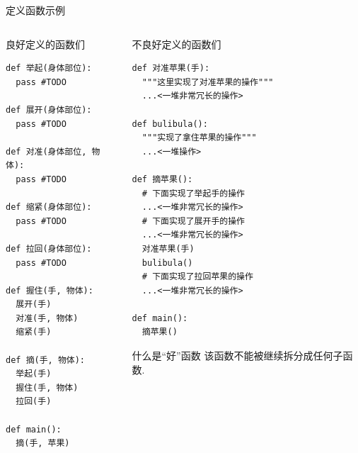 \documentclass{beamer}
\begin{document}
    \begin{frame}[fragile]{定义函数示例}
      \begin{columns}
        \begin{column}{0.4\textwidth}
          \begin{block}{\tiny 良好定义的函数们}
            \begin{lstlisting}
def 举起(身体部位):
  pass #TODO   

def 展开(身体部位):
  pass #TODO 

def 对准(身体部位, 物体):
  pass #TODO 

def 缩紧(身体部位):
  pass #TODO 

def 拉回(身体部位):
  pass #TODO 

def 握住(手, 物体):
  展开(手)
  对准(手, 物体)
  缩紧(手)

def 摘(手, 物体):
  举起(手)
  握住(手, 物体)
  拉回(手)

def main():
  摘(手, 苹果)
            \end{lstlisting}
          \end{block}
        \end{column}
        \begin{column}{0.4\textwidth}
          \begin{block}{\tiny 不良好定义的函数们}
            \begin{lstlisting}
def 对准苹果(手):
  """这里实现了对准苹果的操作"""
  ...<一堆非常冗长的操作>

def bulibula():
  """实现了拿住苹果的操作"""
  ...<一堆操作>

def 摘苹果():
  # 下面实现了举起手的操作
  ...<一堆非常冗长的操作>
  # 下面实现了展开手的操作
  ...<一堆非常冗长的操作>
  对准苹果(手)
  bulibula()
  # 下面实现了拉回苹果的操作
  ...<一堆非常冗长的操作>

def main():
  摘苹果()
            \end{lstlisting}
          \end{block}
          \begin{block}{\tiny 什么是``好''函数}\tiny
            该函数不能被继续拆分成任何子函数. 
          \end{block}
        \end{column}
      \end{columns}
    \end{frame}
\end{document}
